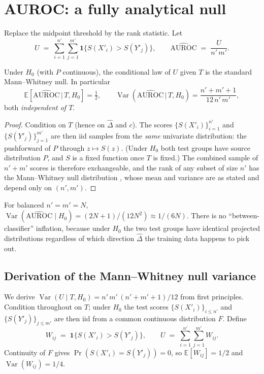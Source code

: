 \documentclass[11pt]{article}
\newcommand{\E}{\mathbb{E}}
\newcommand{\Var}{\operatorname{Var}}
\newcommand{\1}{\mathbf{1}}
\begin{document}
\section{AUROC: a fully analytical null}

Replace the midpoint threshold by the rank statistic. Let
\[
  U \;=\; \sum_{i=1}^{n'}\sum_{j=1}^{m'} \1\!\bigl\{S(X'_i) > S(Y'_j)\bigr\},
  \qquad
  \widehat{\mathrm{AUROC}} \;=\; \frac{U}{n'\,m'}.
\]

\begin{proposition}
Under $H_0$ (with $P$ continuous), the conditional law of $U$ given $T$
is the standard Mann--Whitney null. In particular
\[
  \E\!\left[\widehat{\mathrm{AUROC}} \,\big|\, T, H_0\right] = \tfrac{1}{2},
  \qquad
  \Var\!\left(\widehat{\mathrm{AUROC}} \,\big|\, T, H_0\right)
   = \frac{n' + m' + 1}{12\,n'\,m'},
\]
both \emph{independent of $T$}.
\end{proposition}

\begin{proof}
Condition on $T$ (hence on $\hat\Delta$ and $c$). The scores
$\{S(X'_i)\}_{i=1}^{n'}$ and $\{S(Y'_j)\}_{j=1}^{m'}$ are then iid
samples from the \emph{same} univariate distribution: the pushforward of
$P$ through $z \mapsto S(z)$. (Under $H_0$ both test groups have source
distribution $P$, and $S$ is a fixed function once $T$ is fixed.) The
combined sample of $n' + m'$ scores is therefore exchangeable, and the
rank of any subset of size $n'$ has the Mann--Whitney null distribution
\cite{HollanderWolfeChicken2014}, whose mean and variance are as stated
and depend only on $(n', m')$.
\end{proof}

For balanced $n' = m' = N$, $\Var(\widehat{\mathrm{AUROC}} \mid H_0)
= (2N+1)/(12 N^2) \approx 1/(6N)$. There is no
``between-classifier'' inflation, because under $H_0$ the two test
groups have identical projected distributions regardless of which
direction $\hat\Delta$ the training data happens to pick out.

\subsection{Derivation of the Mann--Whitney null variance}

We derive $\Var(U \mid T, H_0) = n'\,m'\,(n'+m'+1)/12$ from first
principles. Condition throughout on $T$; under $H_0$ the test scores
$\{S(X'_i)\}_{i \le n'}$ and $\{S(Y'_j)\}_{j \le m'}$ are then iid from a
common continuous distribution $F$. Define
\[
  W_{ij} \;=\; \1\!\bigl\{S(X'_i) > S(Y'_j)\bigr\},
  \qquad
  U \;=\; \sum_{i=1}^{n'} \sum_{j=1}^{m'} W_{ij}.
\]
Continuity of $F$ gives $\Pr(S(X'_i) = S(Y'_j)) = 0$, so
$\E[W_{ij}] = 1/2$ and $\Var(W_{ij}) = 1/4$.
\end{document}
